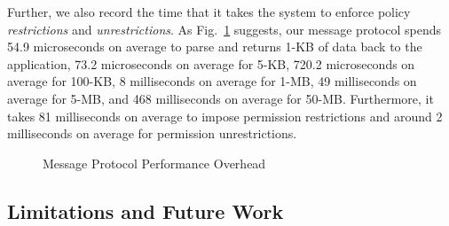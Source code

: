 Further, we also record the time that it takes the system to
enforce policy \textit{restrictions} and \textit{unrestrictions}.  As
Fig.~\ref{fig:performance} suggests, our message 
protocol spends 54.9 microseconds on average to parse and returns 1-KB of
data back to the application, 73.2 microseconds on average for 5-KB, 
720.2 microseconds on average for 100-KB, 8 milliseconds on average
for 1-MB, 49 milliseconds on average for 5-MB, and 468 milliseconds
on average for 50-MB.  Furthermore, it takes 81 milliseconds on average
to impose permission restrictions and around 2 milliseconds on average
for permission unrestrictions.

\begin{figure}[ht]
\centering
{}
\caption{Message Protocol Performance Overhead}
\label{fig:performance}
\end{figure}

\subsection{Limitations and Future Work}


